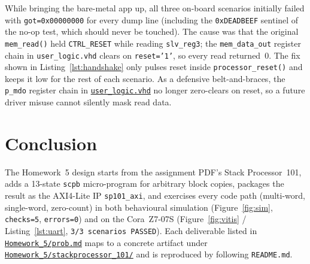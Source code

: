\documentclass[11pt,letterpaper]{article}
\begin{document}
While bringing the bare-metal app up, all three on-board scenarios
initially failed with \texttt{got=0x00000000} for every dump line
(including the \texttt{0xDEADBEEF} sentinel of the no-op test, which
should never be touched).  The cause was that the original
\texttt{mem\_read()} held \texttt{CTRL\_RESET} while reading
\texttt{slv\_reg3}; the \texttt{mem\_data\_out} register chain in
\texttt{user\_logic.vhd} clears on \texttt{reset='1'}, so every read
returned~0.  The fix shown in Listing~\ref{lst:handshake} only pulses
reset inside \texttt{processor\_reset()} and keeps it low for the rest
of each scenario.  As a defensive belt-and-braces, the
\texttt{p\_mdo} register chain in
\href{run:../stackprocessor_101/rtl/user_logic.vhd}{\texttt{user\_logic.vhd}}
no longer zero-clears on reset, so a future driver misuse cannot
silently mask read data.

\section{Conclusion}

The Homework~5 design starts from the assignment PDF's Stack
Processor~101, adds a 13-state \texttt{scpb} micro-program for arbitrary
block copies, packages the result as the AXI4-Lite IP \texttt{sp101\_axi},
and exercises every code path (multi-word, single-word, zero-count) in
both behavioural simulation (Figure~\ref{fig:sim}, \texttt{checks=5},
\texttt{errors=0}) and on the Cora~Z7-07S
(Figure~\ref{fig:vitis} / Listing~\ref{lst:uart},
\texttt{3/3 scenarios PASSED}).  Each deliverable
listed in \href{run:../prob.md}{\texttt{Homework\_5/prob.md}} maps to a
concrete artifact under
\href{run:../stackprocessor_101/}{\texttt{Homework\_5/stackprocessor\_101/}}
and is reproduced by following \texttt{README.md}.
\end{document}
